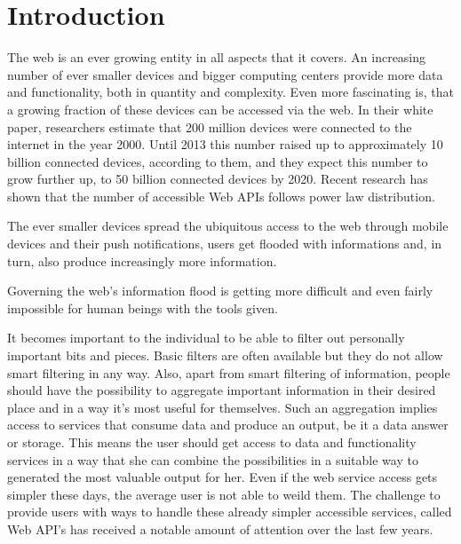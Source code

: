 \chapter{Introduction}
The web is an ever growing entity in all aspects that it covers.
An increasing number of ever smaller devices and bigger computing centers provide more data and functionality, both in quantity and complexity.
Even more fascinating is, that a growing fraction of these devices can be accessed via the web.
In their white paper\cite{citeulike:12243016}, researchers estimate that 200 million devices were connected to the internet in the year 2000.
Until 2013 this number raised up to approximately 10 billion connected devices, according to them, and they expect this number to grow further up, to 50 billion connected devices by 2020.
Recent research\cite{conf/icws/HuangFT12}\cite{wwwProgrammableWebResearch} has shown that the number of accessible Web APIs follows power law distribution.


The ever smaller devices spread the ubiquitous access to the web through mobile devices and their push notifications, users get flooded with informations and, in turn, also produce increasingly more information.


Governing the web's information flood is getting more difficult and even fairly impossible for human beings with the tools given.


It becomes important to the individual to be able to filter out personally important bits and pieces.
Basic filters are often available but they do not allow smart filtering in any way.
Also, apart from smart filtering of information, people should have the possibility to aggregate important information in their desired place and in a way it's most useful for themselves.
Such an aggregation implies access to services that consume data and produce an output, be it a data answer or storage.
This means the user should get access to data and functionality services in a way that she can combine the possibilities in a suitable way to generated the most valuable output for her.
Even if the web service access gets simpler these days, the average user is not able to weild them.
The challenge to provide users with ways to handle these already simpler accessible services, called Web API's has received a notable amount of attention over the last few years.



